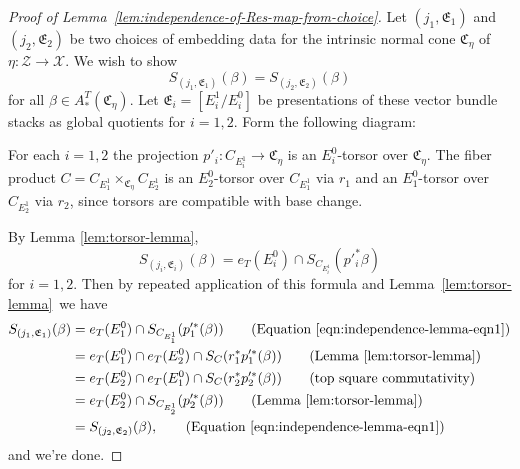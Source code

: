 \documentclass[12pt,dvipsnames]{amsart}
\begin{document}
\begin{proof}[Proof of Lemma~\ref{lem:independence-of-Res-map-from-choice}]
  Let \((j_1, \mathfrak E_1)\) and \((j_2, \mathfrak E_2)\) be two choices of embedding data for the intrinsic normal cone \(\mathfrak C_\eta\) of \(\eta:\mathcal Z\to \mathcal X\). We wish to show
  \[S_{(j_1, \mathfrak E_1)}(\beta) = S_{(j_2, \mathfrak E_2)}(\beta)\] for all \(\beta \in A^T_*(\mathfrak C_\eta)\).
  Let \(\mathfrak E_i = [E^1_i/E^0_i]\) be presentations of these vector bundle stacks as global quotients for \(i = 1,2\). Form the following diagram:
  \begin{center}
  \end{center}
  For each \(i=1,2\) the projection \(p'_i:C_{E^1_i}\to \mathfrak C_\eta\) is an \(E^0_i\)-torsor over \(\mathfrak C_\eta\). The fiber product \(C = C_{E^1_1}\times_{\mathfrak C_\eta}C_{E^1_2}\) is an \(E^0_2\)-torsor over \(C_{E^1_1}\) via \(r_1\) and an \(E^0_1\)-torsor over \(C_{E^1_2}\) via \(r_2\), since torsors are compatible with base change.

  By Lemma \ref{lem:torsor-lemma},
  \begin{equation}\label{eqn:independence-lemma-eqn1}
    S_{(j_i, \mathfrak E_i)}(\beta) = e_T(E^0_i) \cap S_{C_{E^1_i}}(p'^*_i\beta)
  \end{equation}
  for \(i = 1,2\). Then by repeated application of this formula and Lemma~\ref{lem:torsor-lemma}~we have
  \begin{align*}
    S_{(j_1, \mathfrak E_1)}(\beta) &= e_T(E^0_1) \cap S_{C_{E^1_1}}(p'^*_1(\beta)) \tag{Equation \eqref{eqn:independence-lemma-eqn1}}\\
    &= e_T(E^0_1) \cap e_T(E^0_2) \cap S_{C}(r_1^*p'^*_1(\beta)) \tag{Lemma~\ref{lem:torsor-lemma}}\\
    &= e_T(E^0_2) \cap e_T(E^0_1) \cap S_{C}(r_2^*p'^*_2(\beta)) \tag{top square commutativity}\\
    &= e_T(E^0_2) \cap S_{C_{E^1_2}}(p'^*_2(\beta)) \tag{Lemma~\ref{lem:torsor-lemma}}\\
    &= S_{(j_2, \mathfrak E_2)}(\beta), \tag{Equation \eqref{eqn:independence-lemma-eqn1}}
  \end{align*}
  and we're done.
\end{proof}
\end{document}
